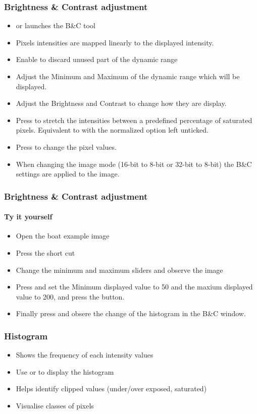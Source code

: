 \documentclass[ignorenonframetext,aspectratio=169,10pt,xcolor=table]{beamer}
\begin{document}
\begin{frame} \frametitle{Brightness \& Contrast adjustment}
  \begin{itemize}
  \item {} or
     launches the B\&C tool
  \item Pixels intensities are mapped linearly to the displayed
    intensity.
  \item Enable to discard unused part of the dynamic range
  \item Adjust the Minimum and Maximum of the dynamic range which will
    be displayed.
  \item Adjust the Brightness and Contrast to change how they are
    display.
  \item Press  to stretch the intensities between a
    predefined percentage of saturated pixels. Equivalent to  with the normalized option left unticked.
  \item Press  to change the pixel values.
  \item When changing the image mode (16-bit to 8-bit or 32-bit to
    8-bit) the B\&C settings are applied to the image.
  \end{itemize}
\end{frame}

\begin{frame} \frametitle{Brightness \& Contrast adjustment}
  \framesubtitle{Ty it yourself}
  \begin{itemize}
  \item Open the boat example image 
  \item Press the short cut 
  \item Change the minimum and maximum sliders and observe the image
  \item Press  and set the Minimum displayed value to 50
    and the maxium displayed value to 200, and press the  button.
  \item Finally press  and obsere the change of the
    histogram in the B\&C window.
  \end{itemize}
\end{frame}

\begin{frame} \frametitle{Histogram}
  \begin{itemize}
  \item Shows the frequency of each intensity values
  \item Use  or  to display the
    histogram
  \item Helps identify clipped values (under/over exposed, saturated)
  \item Visualise classes of pixels
  \end{itemize}
\end{frame}
\end{document}
